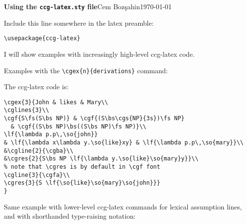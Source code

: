 \documentclass[11pt]{article}
\begin{document}
{\large\bf Using the \verb|ccg-latex.sty| file}\hfill{\small Cem Boz\c{s}ahin}\hfill\today\medskip\bigskip

Include this line somewhere in the latex preamble:\bigskip

\begin{verbatim}
\usepackage{ccg-latex}
\end{verbatim}\bigskip

I will show examples with increasingly high-level ccg-latex code.\bigskip

Examples with the \verb|\cgex{n}{derivations}| command:\bigskip

\medskip\bigskip

The ccg-latex code is:

\begin{verbatim}
\cgex{3}{John & likes & Mary\\
\cglines{3}\\
\cgf{S\fs(S\bs NP)} & \cgf{(S\bs\cgs{NP}{3s})\fs NP} 
  & \cgf{(S\bs NP)\bs((S\bs NP)\fs NP)}\\
\lf{\lambda p.p\,\so{john}} 
& \lf{\lambda x\lambda y.\so{like}xy} & \lf{\lambda p.p\,\so{mary}}\\
&\cgline{2}{\cgba}\\
&\cgres{2}{S\bs NP \lf{\lambda y.\so{like}\so{mary}y}}\\  
% note that \cgres is by default in \cgf font
\cgline{3}{\cgfa}\\
\cgres{3}{S \lf{\so{like}\so{mary}\so{john}}}
}
\end{verbatim}

\newpage
Same example with lower-level ccg-latex commands for lexical assumption lines, and with shorthanded 
type-raising notation:\bigskip
\end{document}
